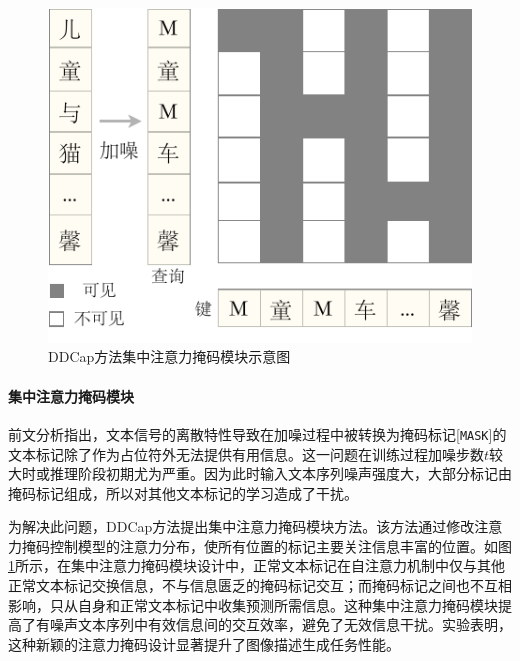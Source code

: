 \begin{figure}
  \centering
  \includegraphics[width=0.6\linewidth]{figures/ddcap-attn.pdf}
  \caption{DDCap方法集中注意力掩码模块示意图}
  \label{fig:ddcap-attn}
\end{figure}

\paragraph{集中注意力掩码模块} 前文分析指出，文本信号的离散特性导致在加噪过程中被转换为掩码标记[\texttt{MASK}]的文本标记除了作为占位符外无法提供有用信息。这一问题在训练过程加噪步数$t$较大时或推理阶段初期尤为严重。因为此时输入文本序列噪声强度大，大部分标记由掩码标记组成，所以对其他文本标记的学习造成了干扰。

为解决此问题，DDCap方法提出集中注意力掩码模块方法。该方法通过修改注意力掩码控制模型的注意力分布，使所有位置的标记主要关注信息丰富的位置。如图\ref{fig:ddcap-attn}所示，在集中注意力掩码模块设计中，正常文本标记在自注意力机制中仅与其他正常文本标记交换信息，不与信息匮乏的掩码标记交互；而掩码标记之间也不互相影响，只从自身和正常文本标记中收集预测所需信息。这种集中注意力掩码模块提高了有噪声文本序列中有效信息间的交互效率，避免了无效信息干扰。实验表明，这种新颖的注意力掩码设计显著提升了图像描述生成任务性能。


